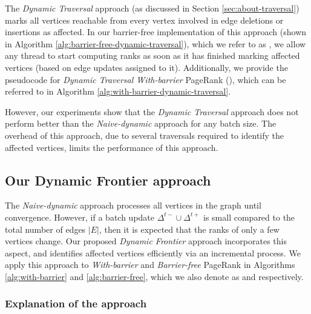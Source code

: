 The \textit{Dynamic Traversal} approach (as discussed in Section \ref{sec:about-traversal}) marks all vertices reachable from every vertex involved in edge deletions or insertions as affected. In our barrier-free implementation of this approach (shown in Algorithm \ref{alg:barrier-free-dynamic-traversal}), which we refer to as \TraBarf{}, we allow any thread to start computing ranks as soon as it has finished marking affected vertices (based on edge updates assigned to it). Additionally, we provide the pseudocode for \textit{Dynamic Traversal With-barrier} PageRank (\TraWbar{}), which can be referred to in Algorithm \ref{alg:with-barrier-dynamic-traversal}.

However, our experiments show that the \textit{Dynamic Traversal} approach does not perform better than the \textit{Naive-dynamic} approach for any batch size. The overhead of this approach, due to several traversals required to identify the affected vertices, limits the performance of this approach.

% 
% 




\subsection{Our Dynamic Frontier approach}
\label{sec:frontier}

The \textit{Naive-dynamic} approach processes all vertices in the graph until convergence. However, if a batch update $\Delta^{t-} \cup \Delta^{t+}$ is small compared to the total number of edges $|E|$, then it is expected that the ranks of only a few vertices change. Our proposed \textit{Dynamic Frontier} approach incorporates this aspect, and identifies affected vertices efficiently via an incremental process. We apply this approach to \textit{With-barrier} and \textit{Barrier-free} PageRank in Algorithms \ref{alg:with-barrier} and \ref{alg:barrier-free}, which we also denote as \FroWbar{} and \FroBarf{} respectively.


\subsubsection{Explanation of the approach}
\label{sec:frontier-explanation}

